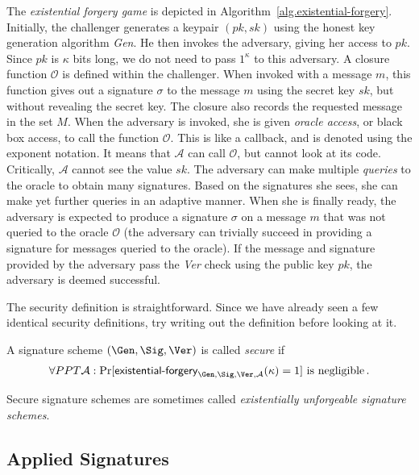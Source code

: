 The \emph{existential forgery game} is depicted in Algorithm~\ref{alg.existential-forgery}.
Initially, the challenger generates a keypair $(pk, sk)$ using the honest key generation
algorithm \emph{Gen}. He then invokes the adversary, giving her access to $pk$. Since
$pk$ is $\kappa$ bits long, we do not need to pass $1^\kappa$ to this adversary.
A closure function $\mathcal{O}$ is defined within the challenger. When invoked
with a message $m$, this function gives out a signature $\sigma$ to the message
$m$ using the secret key $sk$, but without revealing the secret key. The closure
also records the requested message in the set $M$.
When the adversary is invoked, she is given \emph{oracle access}, or black box access,
to call the function $\mathcal{O}$. This is like a callback, and is denoted using the
exponent notation. It means that $\mathcal{A}$ can call $\mathcal{O}$, but
cannot look at its code. Critically, $\mathcal{A}$ cannot see the value $sk$.
The adversary can make multiple \emph{queries} to the oracle to obtain many
signatures. Based on the signatures she sees, she can make yet further queries
in an adaptive manner. When she is finally ready, the adversary is expected
to produce a signature $\sigma$ on a message $m$ that was not queried to the
oracle $\mathcal{O}$ (the adversary can trivially succeed in providing a signature
for messages queried to the oracle). If the message and signature provided by
the adversary pass the \emph{Ver} check using the public key $pk$, the adversary
is deemed successful.

The security definition is straightforward. Since we have already seen a few
identical security definitions, try writing out the definition before looking
at it.

\begin{definition}
  A signature scheme $(\Gen, \Sig, \Ver)$ is called \emph{secure} if
  \begin{align*}
    \forall PPT \mathcal{A}:
    \Pr[\textsf{existential-forgery}_{\Gen, \Sig, \Ver, \mathcal{A}}(\kappa) = 1] \text{ is negligible}\,.
  \end{align*}
\end{definition}

Secure signature schemes are sometimes called \emph{existentially unforgeable signature
schemes}.

\subsection*{Applied Signatures}

